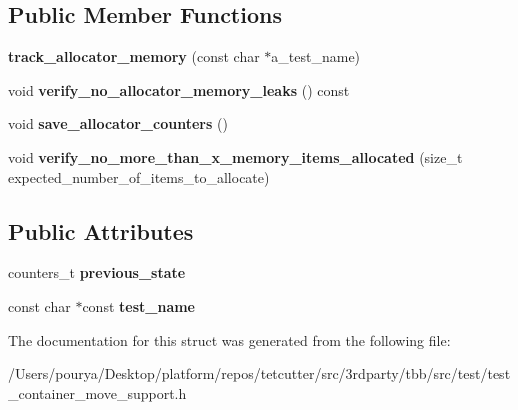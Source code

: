 \subsection*{Public Member Functions}
\begin{DoxyCompactItemize}
\item 
\hypertarget{structtrack__allocator__memory_a67f513a5b53044cdf42e5e275e5ed380}{}{\bfseries track\+\_\+allocator\+\_\+memory} (const char $\ast$a\+\_\+test\+\_\+name)\label{structtrack__allocator__memory_a67f513a5b53044cdf42e5e275e5ed380}

\item 
\hypertarget{structtrack__allocator__memory_adbf8389e928f378b41b75c6312415304}{}void {\bfseries verify\+\_\+no\+\_\+allocator\+\_\+memory\+\_\+leaks} () const \label{structtrack__allocator__memory_adbf8389e928f378b41b75c6312415304}

\item 
\hypertarget{structtrack__allocator__memory_a4fa2cb1facf8b0d36b5608e5cba261fc}{}void {\bfseries save\+\_\+allocator\+\_\+counters} ()\label{structtrack__allocator__memory_a4fa2cb1facf8b0d36b5608e5cba261fc}

\item 
\hypertarget{structtrack__allocator__memory_add23154b88fc1600298a64143ad79b52}{}void {\bfseries verify\+\_\+no\+\_\+more\+\_\+than\+\_\+x\+\_\+memory\+\_\+items\+\_\+allocated} (size\+\_\+t expected\+\_\+number\+\_\+of\+\_\+items\+\_\+to\+\_\+allocate)\label{structtrack__allocator__memory_add23154b88fc1600298a64143ad79b52}

\end{DoxyCompactItemize}
\subsection*{Public Attributes}
\begin{DoxyCompactItemize}
\item 
\hypertarget{structtrack__allocator__memory_a93b29e464cee5a5f26be2eba5452da0e}{}counters\+\_\+t {\bfseries previous\+\_\+state}\label{structtrack__allocator__memory_a93b29e464cee5a5f26be2eba5452da0e}

\item 
\hypertarget{structtrack__allocator__memory_ab0b1b324bb7d2a357ef33c04cbad36c9}{}const char $\ast$const {\bfseries test\+\_\+name}\label{structtrack__allocator__memory_ab0b1b324bb7d2a357ef33c04cbad36c9}

\end{DoxyCompactItemize}


The documentation for this struct was generated from the following file\+:\begin{DoxyCompactItemize}
\item 
/\+Users/pourya/\+Desktop/platform/repos/tetcutter/src/3rdparty/tbb/src/test/test\+\_\+container\+\_\+move\+\_\+support.\+h\end{DoxyCompactItemize}
